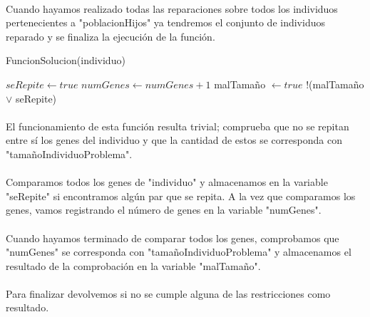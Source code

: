 	\paragraph{}Cuando hayamos realizado todas las reparaciones sobre todos los individuos pertenecientes a "poblacionHijos" ya tendremos el conjunto de individuos reparado y se finaliza la ejecución de la función.

	\begin{algorithm}[H]
		\caption{FuncionSolucion(individuo)}
		\begin{algorithmic}
			\STATE $seRepite \leftarrow true$
			\ENDIF
			\ENDFOR
			\STATE $numGenes \leftarrow numGenes+1$
			\ENDFOR
			\STATE malTamaño $\leftarrow true$
			\ENDIF
			\RETURN !(malTamaño $\vee$ seRepite)
		\end{algorithmic}
	\end{algorithm}

	\paragraph{}El funcionamiento de esta función resulta trivial; comprueba que no se repitan entre sí los genes del individuo y que la cantidad de estos se corresponda con "tamañoIndividuoProblema".
	
	\paragraph{}Comparamos todos los genes de "individuo" y almacenamos en la variable "seRepite" si encontramos algún par que se repita. A la vez que comparamos los genes, vamos registrando el número de genes en la variable "numGenes".
	
	\paragraph{}Cuando hayamos terminado de comparar todos los genes, comprobamos que "numGenes" se corresponda con "tamañoIndividuoProblema" y almacenamos el resultado de la comprobación en la variable "malTamaño".
	
	\paragraph{}Para finalizar devolvemos si no se cumple alguna de las restricciones como resultado.

